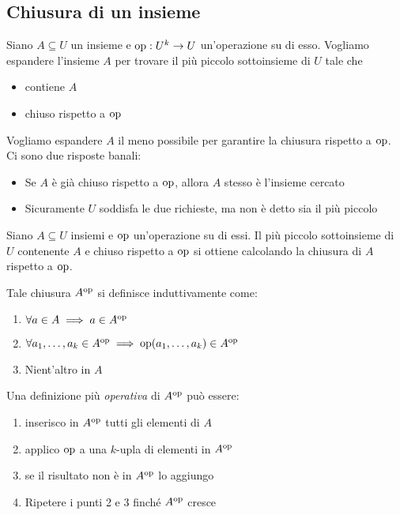 \subsection{Chiusura di un insieme}
Siano $A \subseteq U$ un insieme e $\operatorname{op}: U^k \rightarrow U$ un'operazione su di esso. Vogliamo espandere l'insieme $A$ per trovare il più piccolo sottoinsieme di $U$ tale che
\begin{itemize}
	\item contiene $A$
	\item chiuso rispetto a $\operatorname{op}$
\end{itemize}
Vogliamo espandere $A$ il meno possibile per garantire la chiusura rispetto a $\operatorname{op}$.\\

Ci sono due risposte banali: 
\begin{itemize}
	\item Se $A$ è già chiuso rispetto a $\operatorname{op}$, allora $A$ stesso è l'insieme cercato
	\item Sicuramente $U$ soddisfa le due richieste, ma non è detto sia il più piccolo
\end{itemize}

\begin{theor}
	Siano $A \subseteq U$ insiemi e $\operatorname{op}$ un'operazione su di essi. Il più piccolo sottoinsieme di $U$ contenente $A$ e chiuso rispetto a $\operatorname{op}$ si ottiene calcolando la chiusura di $A$ rispetto a $\operatorname{op}$.\\
\end{theor}
Tale chiusura $A^{\operatorname{op}}$ si definisce induttivamente come:
\begin{enumerate}
	\item $\forall a \in A \implies a \in A^{\operatorname{op}}$
	\item $\forall a_1, \dots, a_k \in A^{\operatorname{op}} \implies \operatorname{op}(a_1, \dots, a_k) \in A^{\operatorname{op}}$
	\item Nient'altro in $A$
\end{enumerate}

Una definizione più \textit{operativa} di $A^{\operatorname{op}}$ può essere:
\begin{enumerate}
	\item inserisco in $A^{\operatorname{op}}$ tutti gli elementi di $A$
	\item applico $\operatorname{op}$ a una $k$-upla di elementi in $A^{\operatorname{op}}$
	\item se il risultato non è in $A^{\operatorname{op}}$ lo aggiungo
	\item Ripetere i punti 2 e 3 finché $A^{\operatorname{op}}$ cresce
\end{enumerate}

